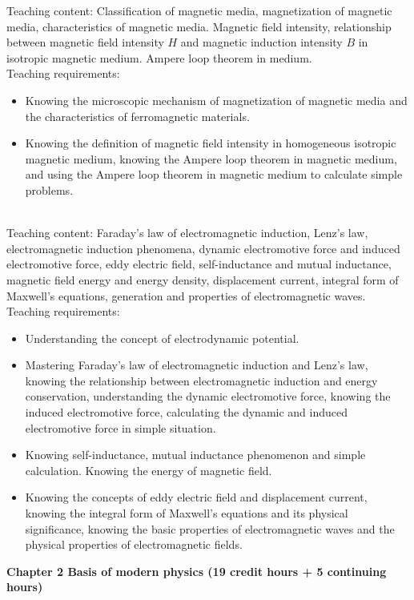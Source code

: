 \documentclass[10pt,a4paper,oneside]{article}
\begin{document}
Teaching content: Classification of magnetic media, magnetization of magnetic media, characteristics of magnetic media. Magnetic field intensity, relationship between magnetic field intensity $H$ and magnetic induction intensity $B$ in isotropic magnetic medium. Ampere loop theorem in medium.\\

Teaching requirements:
\begin{itemize}
	\item Knowing the microscopic mechanism of magnetization of magnetic media and the characteristics of ferromagnetic materials.
	\item Knowing the definition of magnetic field intensity in homogeneous isotropic magnetic medium, knowing the Ampere loop theorem in magnetic medium, and using the Ampere loop theorem in magnetic medium to calculate simple problems.
\end{itemize}
\\

Teaching content: Faraday's law of electromagnetic induction, Lenz's law, electromagnetic induction phenomena, dynamic electromotive force and induced electromotive force, eddy electric field, self-inductance and mutual inductance, magnetic field energy and energy density, displacement current, integral form of Maxwell's equations, generation and properties of electromagnetic waves.\\

Teaching requirements:
\begin{itemize}
	\item Understanding the concept of electrodynamic potential.
	\item Mastering Faraday's law of electromagnetic induction and Lenz's law, knowing the relationship between electromagnetic induction and energy conservation, understanding the dynamic electromotive force, knowing the induced electromotive force, calculating the dynamic and induced electromotive force in simple situation.
	\item  Knowing self-inductance, mutual inductance phenomenon and simple calculation. Knowing the energy of magnetic field.
	\item Knowing the concepts of eddy electric field and displacement current, knowing the integral form of Maxwell's equations and its physical significance, knowing the basic properties of electromagnetic waves and the physical properties of electromagnetic fields.
\end{itemize}
{\bfseries Chapter 2 Basis of modern physics (19 credit hours + 5 continuing hours)}\\
\end{document}
